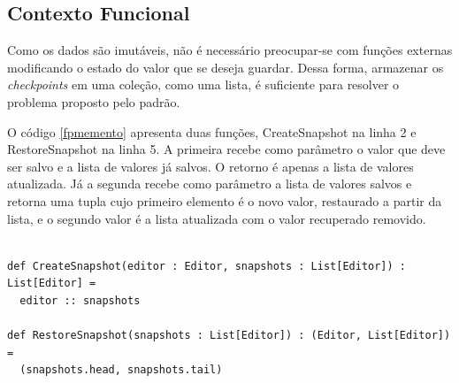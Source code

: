 \subsection*{Contexto Funcional}

Como os dados são imutáveis, não é necessário 
preocupar-se com funções externas modificando o 
estado do valor que se deseja guardar. Dessa forma, 
armazenar os \textit{checkpoints} em uma coleção, como 
uma lista, é suficiente para resolver o problema 
proposto pelo padrão.

O código \ref{fpmemento} apresenta duas funções, 
CreateSnapshot na linha 2 e RestoreSnapshot na linha 
5. A primeira recebe como parâmetro o valor que 
deve ser salvo e a lista de valores já salvos. 
O retorno é apenas a lista de valores atualizada. 
Já a segunda recebe como parâmetro a lista de 
valores salvos e retorna uma tupla cujo 
primeiro elemento é o novo valor, restaurado 
a partir da lista, e o segundo valor é a 
lista atualizada com o valor recuperado 
removido.

\begin{lstlisting}[caption={Memento Funcional},label=fpmemento]

def CreateSnapshot(editor : Editor, snapshots : List[Editor]) : List[Editor] =
  editor :: snapshots

def RestoreSnapshot(snapshots : List[Editor]) : (Editor, List[Editor]) =
  (snapshots.head, snapshots.tail)

\end{lstlisting}